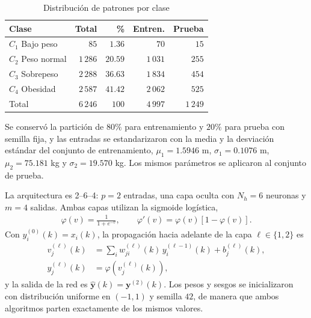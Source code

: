 \documentclass[conference]{IEEEtran}
\begin{document}
\begin{table}[htbp]
\caption{Distribución de patrones por clase}
\label{tab:clases}
\begin{center}
\begin{tabular}{lrrrr}
\toprule
\textbf{Clase} & \textbf{Total} & \textbf{\%} & \textbf{Entren.} & \textbf{Prueba} \\
\midrule
$C_1$ Bajo peso   & $85$     & $1.36$  & $70$     & $15$  \\
$C_2$ Peso normal & $1\,286$ & $20.59$ & $1\,031$ & $255$ \\
$C_3$ Sobrepeso   & $2\,288$ & $36.63$ & $1\,834$ & $454$ \\
$C_4$ Obesidad    & $2\,587$ & $41.42$ & $2\,062$ & $525$ \\
\midrule
Total             & $6\,246$ & $100$   & $4\,997$ & $1\,249$ \\
\bottomrule
\end{tabular}
\end{center}
\end{table}

Se conservó la partición de $80\%$ para entrenamiento y $20\%$ para prueba
con semilla fija, y las entradas se estandarizaron con la media y la
desviación estándar del conjunto de entrenamiento, $\mu_1=1.5946$ m,
$\sigma_1=0.1076$ m, $\mu_2=75.181$ kg y $\sigma_2=19.570$ kg. Los mismos
parámetros se aplicaron al conjunto de prueba.

La arquitectura es 2--6--4: $p=2$ entradas, una capa oculta con $N_h=6$
neuronas y $m=4$ salidas. Ambas capas utilizan la sigmoide logística,
\begin{align}
    \label{eq:sigmoide}
    \varphi(v)=\frac{1}{1+e^{-v}},\qquad \varphi'(v)=\varphi(v)\left[1-\varphi(v)\right].
\end{align}
Con $y_i^{(0)}(k)=x_i(k)$, la propagación hacia adelante de la capa
$\ell\in\{1,2\}$ es
\begin{align}
    \label{eq:v}
    v_j^{(\ell)}(k)&=\sum_{i} w_{ji}^{(\ell)}(k)\,y_i^{(\ell-1)}(k)+b_j^{(\ell)}(k),\\
    \label{eq:y}
    y_j^{(\ell)}(k)&=\varphi\!\left(v_j^{(\ell)}(k)\right),
\end{align}
y la salida de la red es $\widehat{\mathbf{y}}(k)=\mathbf{y}^{(2)}(k)$. Los
pesos y sesgos se inicializaron con distribución uniforme en $(-1,1)$ y
semilla $42$, de manera que ambos algoritmos parten exactamente de los
mismos valores.
\end{document}
